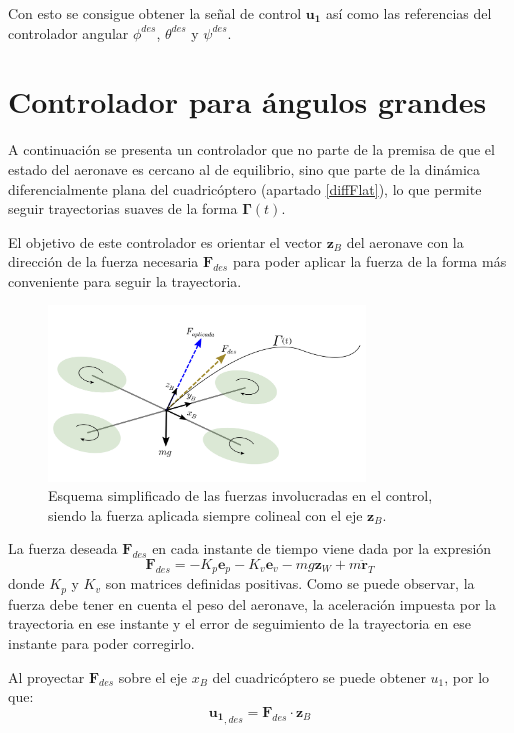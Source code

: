 Con esto se consigue obtener la señal de control $\mathbf{u_1}$ así como las referencias del controlador angular $\phi^{des}$, $\theta^{des}$ y $\psi^{des}$.

\section{Controlador para ángulos grandes}
A continuación se presenta un controlador que no parte de la premisa de que el estado del aeronave es cercano al de equilibrio, sino que parte de la dinámica diferencialmente plana del cuadricóptero (apartado \ref{diffFlat}), lo que permite seguir trayectorias suaves de la forma $\mathbf{\Gamma}(t)$.

El objetivo de este controlador es orientar el vector $\mathbf{z}_B$ del aeronave con la dirección de la fuerza necesaria $\mathbf{F}_{des}$ para poder aplicar la fuerza de la forma más conveniente para seguir la trayectoria.
\begin{figure}[htb!]
	\centering
	\includegraphics[width=0.75\textwidth]{imagenes/control2}
	\caption{Esquema simplificado de las fuerzas involucradas en el control, siendo la fuerza aplicada siempre colineal con el eje $\mathbf{z}_B$. }
	\label{modelado:uav_coordinte}
\end{figure}


La fuerza deseada $\mathbf{F}_{des}$ en cada instante de tiempo viene dada por la expresión
\begin{equation}
	\mathbf{F}_{des} = -K_p	\mathbf{e}_p - K_v	\mathbf{e}_v - mg	\mathbf{z}_W + m	\mathbf{\ddot r}_T
\end{equation}
donde $K_p$ y $K_v$ son matrices definidas positivas.
Como se puede observar, la fuerza debe tener en cuenta el peso del aeronave, la aceleración impuesta por la trayectoria en ese instante y el error de seguimiento de la trayectoria en ese instante para poder corregirlo.

Al proyectar $\mathbf{F}_{des}$ sobre el eje $x_B$ del cuadricóptero se puede obtener $u_1$, por lo que:
\begin{equation}
	\mathbf{u_1}_{,des} = \mathbf{F}_{des}\cdot \mathbf{z}_B
\end{equation}

